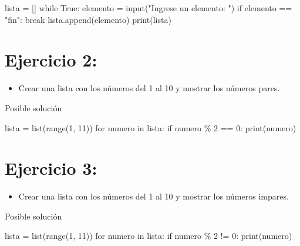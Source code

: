 \documentclass[
  a4paper,
  DIV=11,
  numbers=noendperiod,
  onepage,
  openany]{scrreprt}
\newenvironment{Shaded}{\begin{snugshade}}{\end{snugshade}}
\newcommand{\BuiltInTok}[1]{\textcolor[rgb]{0.00,0.23,0.31}{#1}}
\newcommand{\ControlFlowTok}[1]{\textcolor[rgb]{0.00,0.23,0.31}{#1}}
\newcommand{\DecValTok}[1]{\textcolor[rgb]{0.68,0.00,0.00}{#1}}
\newcommand{\KeywordTok}[1]{\textcolor[rgb]{0.00,0.23,0.31}{#1}}
\newcommand{\NormalTok}[1]{\textcolor[rgb]{0.00,0.23,0.31}{#1}}
\newcommand{\OperatorTok}[1]{\textcolor[rgb]{0.37,0.37,0.37}{#1}}
\newcommand{\StringTok}[1]{\textcolor[rgb]{0.13,0.47,0.30}{#1}}
\newcommand{\VariableTok}[1]{\textcolor[rgb]{0.07,0.07,0.07}{#1}}
\providecommand{\tightlist}{%
  \setlength{\itemsep}{0pt}\setlength{\parskip}{0pt}}\usepackage{longtable,booktabs,array}
\begin{document}
\begin{Shaded}
\begin{Highlighting}[]
\NormalTok{lista }\OperatorTok{=}\NormalTok{ []}
\ControlFlowTok{while} \VariableTok{True}\NormalTok{:}
\NormalTok{    elemento }\OperatorTok{=} \BuiltInTok{input}\NormalTok{(}\StringTok{"Ingrese un elemento: "}\NormalTok{)}
    \ControlFlowTok{if}\NormalTok{ elemento }\OperatorTok{==} \StringTok{"fin"}\NormalTok{:}
        \ControlFlowTok{break}
\NormalTok{    lista.append(elemento)}
\BuiltInTok{print}\NormalTok{(lista)}
\end{Highlighting}
\end{Shaded}

\section{Ejercicio 2:}\label{ejercicio-2-3}

\begin{itemize}
\tightlist
\item
  Crear una lista con los números del 1 al 10 y mostrar los números
  pares.
\end{itemize}

Posible solución

\begin{Shaded}
\begin{Highlighting}[]
\NormalTok{lista }\OperatorTok{=} \BuiltInTok{list}\NormalTok{(}\BuiltInTok{range}\NormalTok{(}\DecValTok{1}\NormalTok{, }\DecValTok{11}\NormalTok{))}
\ControlFlowTok{for}\NormalTok{ numero }\KeywordTok{in}\NormalTok{ lista:}
    \ControlFlowTok{if}\NormalTok{ numero }\OperatorTok{\%} \DecValTok{2} \OperatorTok{==} \DecValTok{0}\NormalTok{:}
        \BuiltInTok{print}\NormalTok{(numero)}
\end{Highlighting}
\end{Shaded}

\section{Ejercicio 3:}\label{ejercicio-3-3}

\begin{itemize}
\tightlist
\item
  Crear una lista con los números del 1 al 10 y mostrar los números
  impares.
\end{itemize}

Posible solución

\begin{Shaded}
\begin{Highlighting}[]
\NormalTok{lista }\OperatorTok{=} \BuiltInTok{list}\NormalTok{(}\BuiltInTok{range}\NormalTok{(}\DecValTok{1}\NormalTok{, }\DecValTok{11}\NormalTok{))}
\ControlFlowTok{for}\NormalTok{ numero }\KeywordTok{in}\NormalTok{ lista:}
    \ControlFlowTok{if}\NormalTok{ numero }\OperatorTok{\%} \DecValTok{2} \OperatorTok{!=} \DecValTok{0}\NormalTok{:}
        \BuiltInTok{print}\NormalTok{(numero)}
\end{Highlighting}
\end{Shaded}
\end{document}
